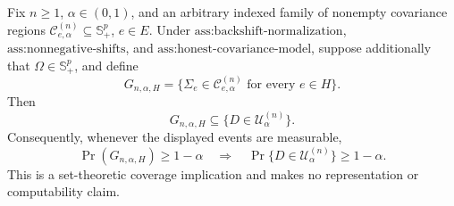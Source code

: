 Fix \(n\geq1\), \(\alpha\in(0,1)\), and an arbitrary indexed family of nonempty covariance regions \(\mathcal C^{(n)}_{e,\alpha}\subseteq\mathbb S_{+}^{p}\), \(e\in E\). Under \(\text{ass:backshift-normalization}\), \(\text{ass:nonnegative-shifts}\), and \(\text{ass:honest-covariance-model}\), suppose additionally that \(\Omega\in\mathbb S_+^p\), and define
\[
G_{n,\alpha,H}
=\{\Sigma_e\in\mathcal C^{(n)}_{e,\alpha}\text{ for every }e\in H\}.
\]
Then
\[
G_{n,\alpha,H}\subseteq\{D\in\mathcal U^{(n)}_\alpha\}.
\]
Consequently, whenever the displayed events are measurable,
\[
\Pr(G_{n,\alpha,H})\geq1-\alpha
\quad\Longrightarrow\quad
\Pr\{D\in\mathcal U^{(n)}_\alpha\}\geq1-\alpha.
\]
This is a set-theoretic coverage implication and makes no representation or computability claim.